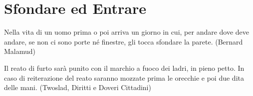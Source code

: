\section{Sfondare ed Entrare}\hypertarget{sfondare}{}\label{sfondarecap}

\begin{changemargin}{0.3cm}{0.3cm}\begin{enfasi}{
Nella vita di un uomo prima o poi arriva un giorno in cui, per andare dove deve andare, se non ci sono porte né finestre, gli tocca sfondare la parete. (Bernard Malamud)

\medskip

Il reato di furto sarà punito con il marchio a fuoco dei ladri, in pieno petto. In caso di reiterazione del reato saranno mozzate prima le orecchie e poi due dita delle mani. (Twoslad, Diritti e Doveri Cittadini)

}\end{enfasi}\end{changemargin}\medskip

